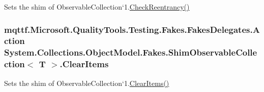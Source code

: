 Sets the shim of Observable\-Collection`1.\hyperlink{class_system_1_1_collections_1_1_object_model_1_1_fakes_1_1_shim_observable_collection_3_01_t_01_4_a13b074e6cd9cd946e8fd03e48ad31228}{Check\-Reentrancy()}

\hypertarget{class_system_1_1_collections_1_1_object_model_1_1_fakes_1_1_shim_observable_collection_3_01_t_01_4_a84f08ed60776f5ac62c86d96b7287ba4}{
\subsubsection[{Clear\-Items}]{\setlength{\rightskip}{0pt plus 5cm}mqttf.\-Microsoft.\-Quality\-Tools.\-Testing.\-Fakes.\-Fakes\-Delegates.\-Action System.\-Collections.\-Object\-Model.\-Fakes.\-Shim\-Observable\-Collection$<$ T $>$.Clear\-Items\hspace{0.3cm}{\ttfamily [set]}}}\label{class_system_1_1_collections_1_1_object_model_1_1_fakes_1_1_shim_observable_collection_3_01_t_01_4_a84f08ed60776f5ac62c86d96b7287ba4}


Sets the shim of Observable\-Collection`1.\hyperlink{class_system_1_1_collections_1_1_object_model_1_1_fakes_1_1_shim_observable_collection_3_01_t_01_4_a84f08ed60776f5ac62c86d96b7287ba4}{Clear\-Items()}

